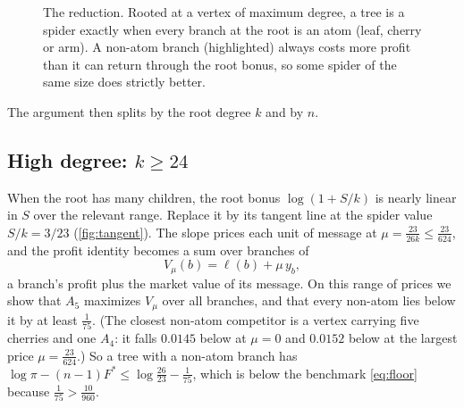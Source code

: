 \documentclass[11pt]{article}
\theoremstyle{definition}
\newcommand{\bell}{\ell}
\newcommand{\Fs}{F^{\ast}}
\begin{document}
\begin{figure}[htbp]\centering
{}
\caption{The reduction. Rooted at a vertex of maximum degree, a tree is a spider exactly when every
branch at the root is an atom (leaf, cherry or arm). A non-atom branch (highlighted) always costs more
profit than it can return through the root bonus, so some spider of the same size does strictly better.}
\label{fig:reduction}
\end{figure}

The argument then splits by the root degree $k$ and by $n$.

\subsection{High degree: $k\ge24$}

When the root has many children, the root bonus $\log(1+S/k)$ is nearly linear in $S$ over the relevant
range. Replace it by its tangent line at the spider value $S/k=3/23$ (\cref{fig:tangent}). The slope
prices each unit of message at $\mu=\tfrac{23}{26k}\le\tfrac{23}{624}$, and the profit identity becomes
a sum over branches of
\[
  V_\mu(b)=\bell(b)+\mu\,y_b,
\]
a branch's profit plus the market value of its message. On this range of prices we show that $A_5$
maximizes $V_\mu$ over all branches, and that every non-atom lies below it by at least $\tfrac1{75}$.
(The closest non-atom competitor is a vertex carrying five cherries and one $A_4$: it falls $0.0145$ below at
$\mu=0$ and $0.0152$ below at the largest price $\mu=\frac{23}{624}$.)
So a tree with a non-atom branch has $\log\pi-(n-1)\Fs\le\log\tfrac{26}{23}-\tfrac1{75}$, which is below
the benchmark \eqref{eq:floor} because $\tfrac1{75}>\tfrac{10}{960}$.
\end{document}
